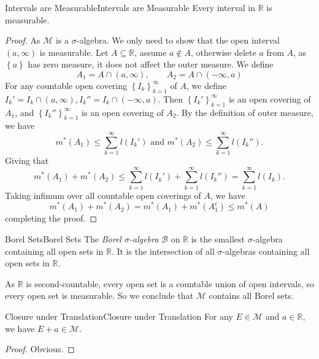 \documentclass[../main.tex]{subfiles}
\begin{document}
\begin{theorem}{Intervals are Measurable}{Intervals are Measurable}
	Every interval in $\mathbb{R}$ is measurable.
\end{theorem}
\begin{proof}
	As $\mathcal{M}$ is a $\sigma$-algebra. We only need to show that the open interval $(a,\infty )$ is measurable. Let $A \subseteq \mathbb{R}$, assume $a\notin A$, otherwise delete $a$ from $A$, as $\left\{ a \right\}$ has zero measure, it does not affect the outer measure. We define
	\begin{equation*}
		A_1 = A \cap (a,\infty ), \qquad A_2 = A \cap (-\infty ,a)
	\end{equation*}
	For any countable open covering $\left\{ I_k \right\}_{k=1}^{\infty }$ of $A$, we define $I_k' = I_k \cap (a,\infty ), I_k'' = I_k \cap (-\infty ,a)$. Then $\left\{ I_k' \right\}_{k=1}^{\infty }$ is an open covering of $A_1$, and $\left\{ I_k'' \right\}_{k=1}^{\infty }$ is an open covering of $A_2$. By the definition of outer measure, we have
	\begin{equation*}
		m^*(A_1)\leq \sum_{k=1}^{\infty } l(I_k') \text{ and } m^*(A_2)\leq \sum_{k=1}^{\infty } l(I_k'').
	\end{equation*}
	Giving that
	\begin{equation*}
		m^*(A_1) + m^*(A_2) \leq \sum_{k=1}^{\infty } l(I_k') + \sum_{k=1}^{\infty } l(I_k'') = \sum_{k=1}^{\infty } l(I_k).
	\end{equation*}
	Taking infimum over all countable open coverings of $A$, we have
	\begin{equation*}
		m^*(A_1) + m^*(A_2) = m^*(A_1) + m^*(A_1^c) \leq m^*(A)
	\end{equation*}
	completing the proof.
\end{proof}

\begin{definition}{Borel Sets}{Borel Sets}
	The \emph{Borel $\sigma$-algebra} $\mathcal{B}$ on $\mathbb{R}$ is the smallest $\sigma$-algebra containing all open sets in $\mathbb{R}$. It is the intersection of all $\sigma$-algebras containing all open sets in $\mathbb{R}$.
\end{definition}

As $\mathbb{R}$ is second-countable, every open set is a countable union of open intervals, so every open set is measurable. So we conclude that $\mathcal{M}$ contains all Borel sets.

\begin{theorem}{Closure under Translation}{Closure under Translation}
	For any $E\in \mathcal{M}$ and $a\in \mathbb{R}$, we have $E+a \in \mathcal{M}$.
\end{theorem}
\begin{proof}
Obvious.
\end{proof}
\end{document}
